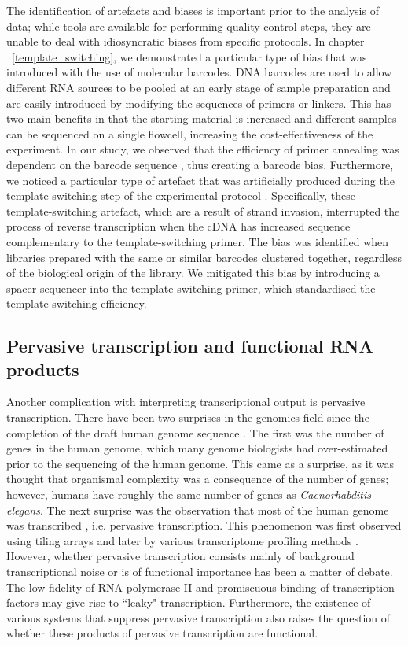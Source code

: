 The identification of artefacts and biases is important prior to the analysis of data; while tools \citep{pmid19737799} are available for performing quality control steps, they are unable to deal with idiosyncratic biases from specific protocols. In chapter ~\ref{template_switching}, we demonstrated a particular type of bias that was introduced with the use of molecular barcodes. DNA barcodes are used to allow different RNA sources to be pooled at an early stage of sample preparation and are easily introduced by modifying the sequences of primers or linkers. This has two main benefits in that the starting material is increased and different samples can be sequenced on a single flowcell, increasing the cost-effectiveness of the experiment. In our study, we observed that the efficiency of primer annealing was dependent on the barcode sequence \citep{Tang01022013}, thus creating a barcode bias. Furthermore, we noticed a particular type of artefact that was artificially produced during the template-switching step of the experimental protocol \citep{Tang01022013}. Specifically, these template-switching artefact, which are a result of strand invasion, interrupted the process of reverse transcription when the cDNA has increased sequence complementary to the template-switching primer. The bias was identified when libraries prepared with the same or similar barcodes clustered together, regardless of the biological origin of the library. We mitigated this bias by introducing a spacer sequencer into the template-switching primer, which standardised the template-switching efficiency.

\subsection{Pervasive transcription and functional RNA products}

Another complication with interpreting transcriptional output is pervasive transcription. There have been two surprises in the genomics field since the completion of the draft human genome sequence \citep{lander2001initial,venter2001sequence}. The first was the number of genes in the human genome, which many genome biologists had over-estimated prior to the sequencing of the human genome. This came as a surprise, as it was thought that organismal complexity was a consequence of the number of genes; however, humans have roughly the same number of genes as \textit{Caenorhabditis elegans}. The next surprise was the observation that most of the human genome was transcribed \citep{pmid11988577, pmid17571346}, i.e. pervasive transcription. This phenomenon was first observed using tiling arrays \citep{pmid17510325} and later by various transcriptome profiling methods \citep{pmid22955620}. However, whether pervasive transcription consists mainly of background transcriptional noise or is of functional importance has been a matter of debate. The low fidelity of RNA polymerase II \citep{pmid17277804} and promiscuous binding of transcription factors \citep{pmid22868264} may give rise to ``leaky" transcription. Furthermore, the existence of various systems that suppress pervasive transcription \citep{pmid24267449} also raises the question of whether these products of pervasive transcription are functional.

